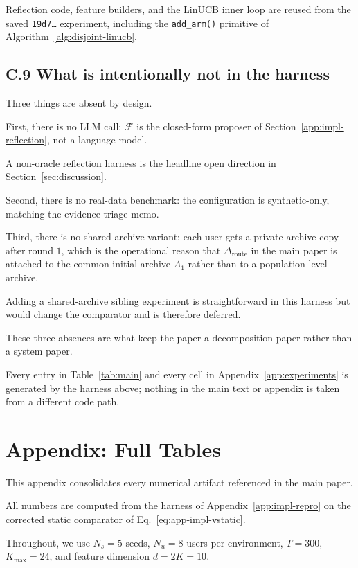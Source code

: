 \documentclass{article} %
\begin{document}
Reflection code, feature builders, and the LinUCB inner loop are reused from the saved \texttt{19d7\ldots} experiment, including the \texttt{add\_arm()} primitive of Algorithm~\ref{alg:disjoint-linucb}.

\subsection{C.9 What is intentionally not in the harness}

\label{app:impl-not-included}

Three things are absent by design.

First, there is no LLM call: $\mathcal F$ is the closed-form proposer of Section~\ref{app:impl-reflection}, not a language model.

A non-oracle reflection harness is the headline open direction in Section~\ref{sec:discussion}.

Second, there is no real-data benchmark: the configuration is synthetic-only, matching the evidence triage memo.

Third, there is no shared-archive variant: each user gets a private archive copy after round $1$, which is the operational reason that $\Delta_{\mathrm{route}}$ in the main paper is attached to the common initial archive $A_1$ rather than to a population-level archive.

Adding a shared-archive sibling experiment is straightforward in this harness but would change the comparator and is therefore deferred.

These three absences are what keep the paper a decomposition paper rather than a system paper.

Every entry in Table~\ref{tab:main} and every cell in Appendix~\ref{app:experiments} is generated by the harness above; nothing in the main text or appendix is taken from a different code path.

\section{Appendix: Full Tables}

\label{app:tables}

This appendix consolidates every numerical artifact referenced in the main paper.

All numbers are computed from the harness of Appendix~\ref{app:impl-repro} on the corrected static comparator of Eq.~\eqref{eq:app-impl-vstatic}.

Throughout, we use $N_s=5$ seeds, $N_u=8$ users per environment, $T=300$, $K_{\max}=24$, and feature dimension $d=2K=10$.
\end{document}
